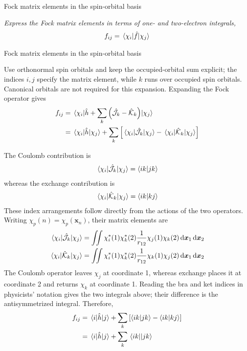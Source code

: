 \documentclass[11pt,a4paper,titlepage]{article}
\numberwithin{equation}{section}
\newcommand{\bx}{\boldsymbol{x}}
\newcommand{\hh}{\Hat{h}}
\newcommand{\hf}{\Hat{f}}
\newcommand{\chJ}{\Hat{\mathcal{J}}}
\newcommand{\chK}{\Hat{\mathcal{K}}}
\newcommand{\violet}[1]{\textcolor{hfViolet}{#1}}
\begin{document}
\begin{hfexercise}{Fock matrix elements in the spin-orbital basis}

\violet{\textit{Express the Fock matrix elements in terms of one- and
two-electron integrals,
\[
  f_{ij}
  =
  \mel{\chi_i}{\hf}{\chi_j}
\]
}}

\end{hfexercise}
\begin{hfsolution}{Fock matrix elements in the spin-orbital basis}

Use orthonormal spin orbitals and keep the occupied-orbital sum explicit;
the indices $i,j$ specify the matrix element, while $k$ runs over occupied
spin orbitals. Canonical orbitals are not required for this expansion.
Expanding the Fock operator gives
\begin{equation}
\begin{split}
  f_{ij}
  &=
  \mel{\chi_i}
      {
        \hh
        +
        \sum_k
        \qty(
          \chJ_k-\chK_k
        )
      }
      {\chi_j}
  \\
  &=
  \mel{\chi_i}{\hh}{\chi_j}
  +
  \sum_k
  \qty[
    \mel{\chi_i}{\chJ_k}{\chi_j}
    -
    \mel{\chi_i}{\chK_k}{\chi_j}
  ]
\end{split}
\end{equation}

The Coulomb contribution is
\begin{equation}
  \mel{\chi_i}{\chJ_k}{\chi_j}
  =
  \braket{ik}{jk}
\end{equation}
whereas the exchange contribution is
\begin{equation}
  \mel{\chi_i}{\chK_k}{\chi_j}
  =
  \braket{ik}{kj}
\end{equation}
These index arrangements follow directly from the actions of the two
operators. Writing $\chi_p(n)=\chi_p(\bx_n)$, their matrix elements are
\begin{align}
  \mel{\chi_i}{\chJ_k}{\chi_j}
  &=\iint\chi_i^*(1)\chi_k^*(2)\frac{1}{r_{12}}
    \chi_j(1)\chi_k(2)\dd{\bx_1}\dd{\bx_2}\\
  \mel{\chi_i}{\chK_k}{\chi_j}
  &=\iint\chi_i^*(1)\chi_k^*(2)\frac{1}{r_{12}}
    \chi_k(1)\chi_j(2)\dd{\bx_1}\dd{\bx_2}
\end{align}
The Coulomb operator leaves $\chi_j$ at coordinate 1, whereas exchange
places it at coordinate 2 and returns $\chi_k$ at coordinate 1. Reading
the bra and ket indices in physicists' notation gives the two integrals
above; their difference is the antisymmetrized integral.
Therefore,
\begin{equation}
\begin{split}
  f_{ij}
  &=
  \mel{i}{\hh}{j}
  +
  \sum_k
  \qty[
    \braket{ik}{jk}
    -
    \braket{ik}{kj}
  ]
  \\
  &=
  \mel{i}{\hh}{j}
  +
  \sum_k
  \mel{ik}{}{jk}
  \label{eq:fock-matrix-spin-orbital}
\end{split}
\end{equation}


\end{hfsolution}
\end{document}
